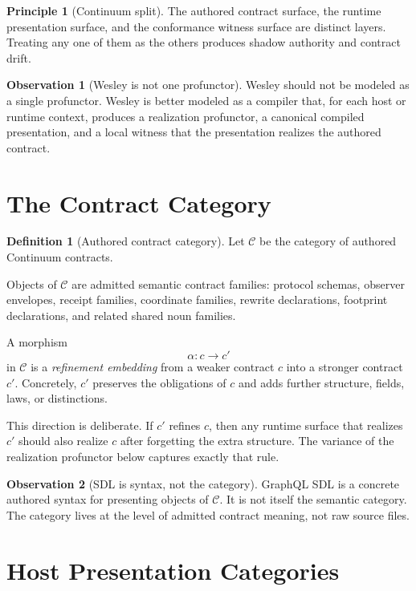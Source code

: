\documentclass[11pt]{article}
\newcommand{\Ctr}{\mathcal{C}}
\theoremstyle{definition}
\newtheorem{definition}{Definition}
\newtheorem{observation}{Observation}
\newtheorem{principle}{Principle}
\begin{document}
\begin{principle}[Continuum split]
The authored contract surface, the runtime presentation surface, and the
conformance witness surface are distinct layers. Treating any one of them as
the others produces shadow authority and contract drift.
\end{principle}

\begin{observation}[Wesley is not one profunctor]
Wesley should not be modeled as a single profunctor. Wesley is better modeled
as a compiler that, for each host or runtime context, produces a realization
profunctor, a canonical compiled presentation, and a local witness that the
presentation realizes the authored contract.
\end{observation}

\section{The Contract Category}

\begin{definition}[Authored contract category]
Let $\Ctr$ be the category of authored Continuum contracts.

Objects of $\Ctr$ are admitted semantic contract families: protocol schemas,
observer envelopes, receipt families, coordinate families, rewrite
declarations, footprint declarations, and related shared noun families.

A morphism
\[
\alpha : c \to c'
\]
in $\Ctr$ is a \emph{refinement embedding} from a weaker contract $c$ into a
stronger contract $c'$. Concretely, $c'$ preserves the obligations of $c$ and
adds further structure, fields, laws, or distinctions.
\end{definition}

This direction is deliberate. If $c'$ refines $c$, then any runtime surface
that realizes $c'$ should also realize $c$ after forgetting the extra
structure. The variance of the realization profunctor below captures exactly
that rule.

\begin{observation}[SDL is syntax, not the category]
GraphQL SDL is a concrete authored syntax for presenting objects of $\Ctr$.
It is not itself the semantic category. The category lives at the level of
admitted contract meaning, not raw source files.
\end{observation}

\section{Host Presentation Categories}
\end{document}

